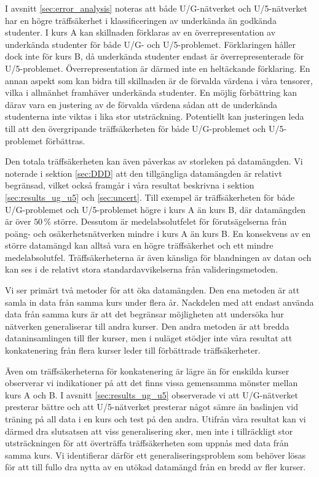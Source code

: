 I avsnitt \ref{sec:error_analysis} noteras att både U/G-nätverket och U/5-nätverket har en högre träffsäkerhet i klassificeringen av underkända än godkända studenter. I kurs A kan skillnaden förklaras av en överrepresentation av underkända studenter för både U/G- och U/5-problemet. Förklaringen håller dock inte för kurs B, då underkända studenter endast är överrepresenterade för U/5-problemet. Överrepresentation är därmed inte en heltäckande förklaring. En annan aspekt som kan bidra till skillnaden är de förvalda värdena i våra tensorer, vilka i allmänhet framhäver underkända studenter. En möjlig förbättring kan därav vara en justering av de förvalda värdena sådan att de underkända studenterna inte viktas i lika stor utsträckning. Potentiellt kan justeringen leda till att den övergripande träffsäkerheten för både U/G-problemet och U/5-problemet förbättras.

Den totala träffsäkerheten kan även påverkas av storleken på datamängden. Vi noterade i sektion \ref{sec:DDD} att den tillgängliga datamängden är relativt begränsad, vilket också framgår i våra resultat beskrivna i sektion \ref{sec:results_ug_u5} och \ref{sec:uncert}. Till exempel är träffsäkerheten för både U/G-problemet och U/5-problemet högre i kurs A än kurs B, där datamängden är över $50 \, \%$ större. Dessutom är medelabsolutfelet för förutsägelserna från poäng- och osäkerhetsnätverken mindre i kurs A än kurs B. En konsekvens av en större datamängd kan alltså vara en högre träffsäkerhet och ett mindre medelabsolutfel. Träffsäkerheterna är även känsliga för blandningen av datan och kan ses i de relativt stora standardavvikelserna från valideringsmetoden.

Vi ser primärt två metoder för att öka datamängden. Den ena metoden är att samla in data från samma kurs under flera år. Nackdelen med att endast använda data från samma kurs är att det begränsar möjligheten att undersöka hur nätverken generaliserar till andra kurser.  Den andra metoden är att bredda dataninsamlingen till fler kurser, men i nuläget stödjer inte våra resultat att konkatenering från flera kurser leder till förbättrade träffsäkerheter.

Även om träffsäkerheterna för konkatenering är lägre än för enskilda kurser observerar vi indikationer på att det finns vissa gemensamma mönster mellan kurs A och B. I avsnitt \ref{sec:results_ug_u5} observerade vi att U/G-nätverket presterar bättre och att U/5-nätverket presterar något sämre än baslinjen vid träning på all data i en kurs och test på den andra. Utifrån våra resultat kan vi därmed dra slutsatsen att viss generalisering sker, men inte i tillräckligt stor utsträckningen för att överträffa träffsäkerheten som uppnås med data från samma kurs. Vi identifierar därför ett generaliseringsproblem som behöver lösas för att till fullo dra nytta av en utökad datamängd från en bredd av fler kurser. 

